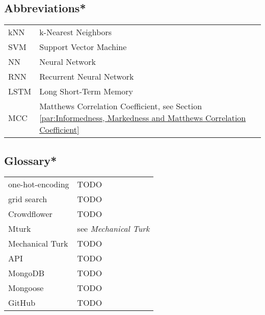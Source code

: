 

\subsection*{Abbreviations*}

\begin{tabular}{ll}
kNN & k-Nearest Neighbors \\
SVM & Support Vector Machine \\
NN & Neural Network \\
RNN & Recurrent Neural Network \\
LSTM & Long Short-Term Memory \\
MCC & Matthews Correlation Coefficient, see Section \ref{par:Informedness, Markedness and Matthews Correlation Coefficient}
\end{tabular}

\subsection*{Glossary*}
\begin{tabular}{ll}
one-hot-encoding & TODO \\
grid search & TODO \\
Crowdflower & TODO \\
Mturk & see \emph{Mechanical Turk} \\
Mechanical Turk & TODO \\
API & TODO \\
MongoDB & TODO \\
Mongoose & TODO \\
GitHub & TODO \\
\end{tabular}




\cleardoublepage
\storeinipagenumber
{}
\setcounter{page}{1}
